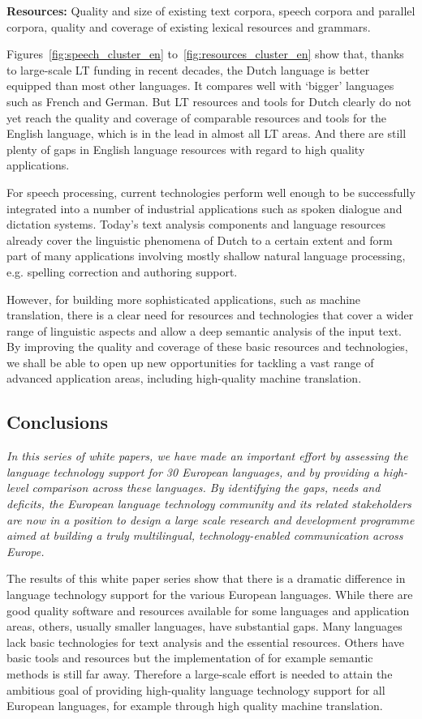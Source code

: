 \documentclass[]{../../metanetpaper}
\begin{document}
\begin{multicols}{2}
\textbf{Resources:} Quality and size of existing text corpora, speech corpora and parallel corpora, quality and coverage of existing lexical resources and grammars.

Figures~\ref{fig:speech_cluster_en} to~\ref{fig:resources_cluster_en} show that,  thanks to large-scale LT funding in recent decades, the Dutch language is better equipped than most other languages. It compares well with `bigger'  languages such as French and German. But LT resources and tools for Dutch clearly do not yet reach the quality and coverage of comparable resources and tools for the English language, which is in the lead in almost all LT areas. And there are still plenty of gaps in English language resources with regard to high quality applications.

    For speech processing, current technologies perform well enough to be successfully integrated into a number of industrial applications such as spoken dialogue and dictation systems. Today's text analysis components and language resources already cover the linguistic phenomena of Dutch to a certain extent and form part of many applications involving mostly shallow natural language processing, e.g. spelling correction and authoring support.

    However, for building more sophisticated applications, such as machine translation, there is a clear need for resources and technologies that cover a wider range of linguistic aspects and allow a deep semantic analysis of the input text. By improving the quality and coverage of these basic resources and technologies, we shall be able to open up new opportunities for tackling a vast range of advanced application areas, including high-quality machine translation.

\subsection{Conclusions}

\textit{In this series of white papers, we have made an important effort by assessing the language technology support for 30 European languages, and by providing a high-level comparison across these languages. By identifying the gaps, needs and deficits, the European language technology community and its related stakeholders are now in a position to design a large scale research and development programme aimed at building a truly multilingual, technology-enabled communication across Europe.}

The results of this white paper series show that there is a dramatic difference in language technology support for the various European languages. While there are good quality software and resources available for some languages and application areas, others, usually smaller languages, have substantial gaps. Many languages lack basic technologies for text analysis and the essential resources. Others have basic tools and resources but the implementation of for example semantic methods is still far away. Therefore a large-scale effort is needed to attain the ambitious goal of providing high-quality language technology support for all European languages, for example through high quality machine translation.


\end{multicols}
\end{document}
